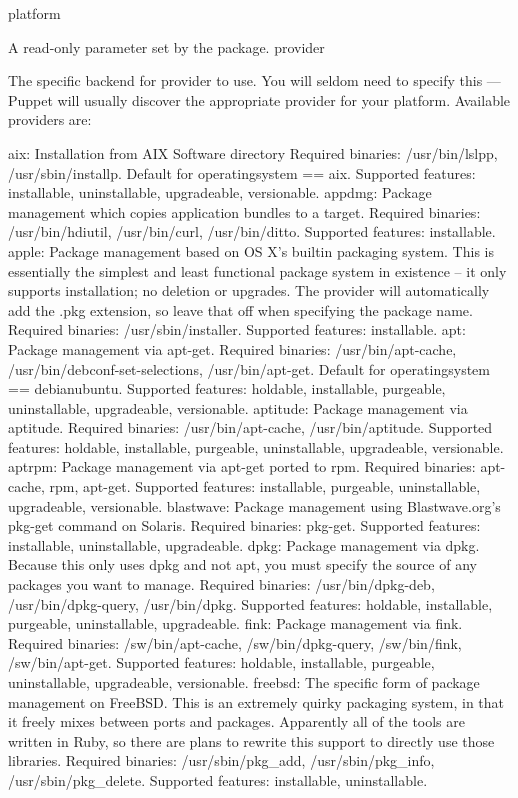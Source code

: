 platform

A read-only parameter set by the package.
provider

The specific backend for provider to use. You will seldom need to specify this — Puppet will usually discover the appropriate provider for your platform. Available providers are:

    aix: Installation from AIX Software directory Required binaries: /usr/bin/lslpp, /usr/sbin/installp. Default for operatingsystem == aix. Supported features: installable, uninstallable, upgradeable, versionable.
    appdmg: Package management which copies application bundles to a target. Required binaries: /usr/bin/hdiutil, /usr/bin/curl, /usr/bin/ditto. Supported features: installable.
    apple: Package management based on OS X’s builtin packaging system. This is essentially the simplest and least functional package system in existence – it only supports installation; no deletion or upgrades. The provider will automatically add the .pkg extension, so leave that off when specifying the package name. Required binaries: /usr/sbin/installer. Supported features: installable.
    apt: Package management via apt-get. Required binaries: /usr/bin/apt-cache, /usr/bin/debconf-set-selections, /usr/bin/apt-get. Default for operatingsystem == debianubuntu. Supported features: holdable, installable, purgeable, uninstallable, upgradeable, versionable.
    aptitude: Package management via aptitude. Required binaries: /usr/bin/apt-cache, /usr/bin/aptitude. Supported features: holdable, installable, purgeable, uninstallable, upgradeable, versionable.
    aptrpm: Package management via apt-get ported to rpm. Required binaries: apt-cache, rpm, apt-get. Supported features: installable, purgeable, uninstallable, upgradeable, versionable.
    blastwave: Package management using Blastwave.org’s pkg-get command on Solaris. Required binaries: pkg-get. Supported features: installable, uninstallable, upgradeable.
    dpkg: Package management via dpkg. Because this only uses dpkg and not apt, you must specify the source of any packages you want to manage. Required binaries: /usr/bin/dpkg-deb, /usr/bin/dpkg-query, /usr/bin/dpkg. Supported features: holdable, installable, purgeable, uninstallable, upgradeable.
    fink: Package management via fink. Required binaries: /sw/bin/apt-cache, /sw/bin/dpkg-query, /sw/bin/fink, /sw/bin/apt-get. Supported features: holdable, installable, purgeable, uninstallable, upgradeable, versionable.
    freebsd: The specific form of package management on FreeBSD. This is an extremely quirky packaging system, in that it freely mixes between ports and packages. Apparently all of the tools are written in Ruby, so there are plans to rewrite this support to directly use those libraries. Required binaries: /usr/sbin/pkg_add, /usr/sbin/pkg_info, /usr/sbin/pkg_delete. Supported features: installable, uninstallable.
